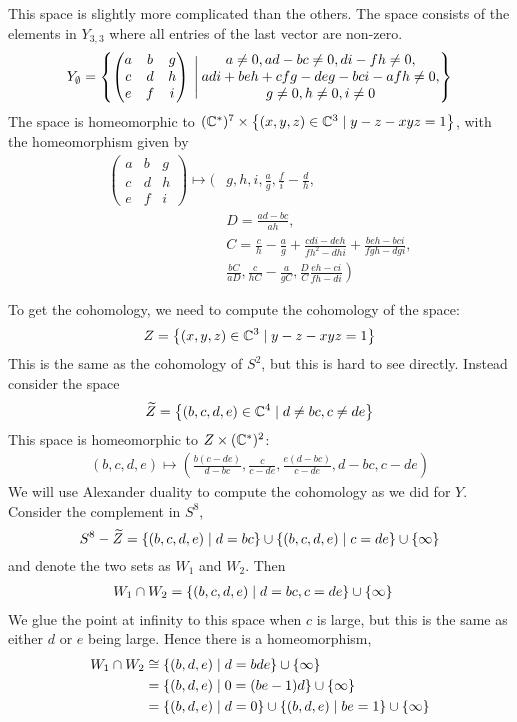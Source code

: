 This space is slightly more complicated than the others. The space
consists of the elements in $Y_{3,3}$ where all entries of the last
vector are non-zero.
\[ Y_{\emptyset} = \left\{ 
  \begin{pmatrix}
    a & b & g \\
    c & d & h \\
    e & f & i
  \end{pmatrix} \:\Bigg\vert\:
  \begin{matrix}
    a \neq 0, ad-bc \neq 0, di-fh \neq 0, \\
    adi+beh+cfg-deg-bci-afh \neq 0, \\
    g\neq 0, h\neq 0, i\neq 0
  \end{matrix}  \right\}\]
The space is homeomorphic to $(\mathbb{C}^*)^7\times \left\{  (x,y,z)\in \mathbb{C}^3
  \mid y-z-xyz = 1 \right\}$, with the homeomorphism given by
\begin{align*}
  \begin{pmatrix}
    a & b & g \\
    c & d & h \\
    e & f & i
  \end{pmatrix} \mapsto \bigg(&g, h, i, \frac{a}{g},
    \frac{f}{i}-\frac{d}{h},\\
  &D=\frac{ad-bc}{ah}, \\
  &C=\frac{c}{h}-\frac{a}{g}+\frac{cdi-deh}{fh^2-dhi} +
  \frac{beh-bci}{fgh-dgi},\\
  &\left.\frac{bC}{aD},\frac{c}{hC}-\frac{a}{gC},
    \frac{D}{C}\frac{eh-ci}{fh-di}\right)
\end{align*}

To get the cohomology, we need to compute the cohomology of the space:
\[ Z=\left\{ (x,y,z)\in\mathbb{C}^3 \mid y-z-xyz = 1 \right\} \]
This is the same as the cohomology of $S^2$, but this is hard to see
directly. Instead consider the space
\[ \widetilde Z = \left\{ (b,c,d,e) \in \mathbb{C}^4 \mid d\neq
  bc, c\neq de \right\} \]
This space is homeomorphic to $Z\times (\mathbb{C}^*)^2$:
\begin{align*}
  (b,c,d,e) \mapsto \left(
    \frac{b(c-de)}{d-bc}, \frac{c}{c-de}, \frac{e(d-bc)}{c-de},
  d-bc, c-de\right)
\end{align*}
We will use Alexander duality to compute the cohomology as we did for
$Y$. Consider the complement in $S^8$,
\[ S^8-\widetilde Z = \left\{ (b,c,d,e) \mid d = bc \right\} \cup \left\{ (b,c,d,e)
  \mid c = de \right\} \cup \left\{ \infty \right\} \]
and denote the two sets as $W_1$ and $W_2$. Then
\begin{align*}
  W_1\cap W_2 &= \left\{ (b,c,d,e) \mid d=bc,c=de \right\}\cup\left\{ \infty \right\}
\end{align*}
We glue the point at infinity to this space when $c$ is large, but
this is the same as either $d$ or $e$ being large. Hence there is a
homeomorphism,
\begin{align*}
  W_1\cap W_2 &\cong \left\{ (b,d,e) \mid d=bde \right\}\cup\left\{ \infty \right\} \\
  &= \left\{ (b,d,e)\mid 0 = (be-1)d \right\}\cup\left\{ \infty \right\} \\
  &= \left\{ (b,d,e) \mid d = 0 \right\} \cup \left\{ (b,d,e) \mid
    be=1 \right\}\cup\left\{ \infty \right\}
\end{align*}

